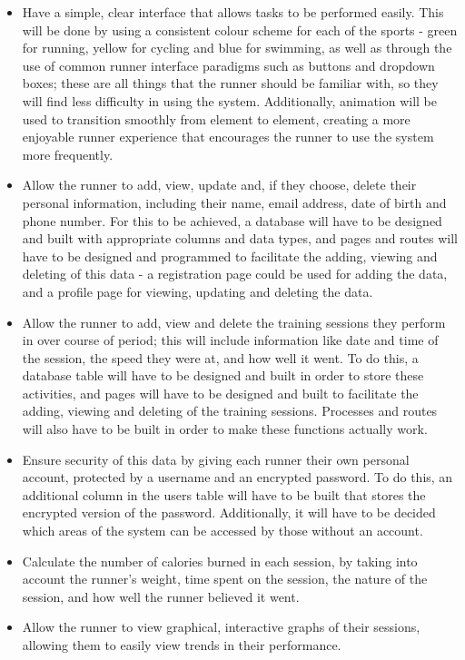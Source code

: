\documentclass{article}[12pt,a4paper]
\begin{document}
\begin{itemize}
    \item Have a simple, clear interface that allows tasks to be performed easily. This will be done by using a consistent colour scheme for each of the sports - green for running, yellow for cycling and blue for swimming, as well as through the use of common runner interface paradigms such as buttons and dropdown boxes; these are all things that the runner should be familiar with, so they will find less difficulty in using the system. Additionally, animation will be used to transition smoothly from element to element, creating a more enjoyable runner experience that encourages the runner to use the system more frequently.

    \item Allow the runner to add, view, update and, if they choose, delete their personal information, including their name, email address, date of birth and phone number. For this to be achieved, a database will have to be designed and built with appropriate columns and data types, and pages and routes will have to be designed and programmed to facilitate the adding, viewing and deleting of this data - a registration page could be used for adding the data, and a profile page for viewing, updating and deleting the data.

    \item Allow the runner to add, view and delete the training sessions they perform in over course of period; this will include information like date and time of the session, the speed they were at, and how well it went. To do this, a database table will have to be designed and built in order to store these activities, and pages will have to be designed and built to facilitate the adding, viewing and deleting of the training sessions. Processes and routes will also have to be built in order to make these functions actually work.

    \item Ensure security of this data by giving each runner their own personal account, protected by a username and an encrypted password. To do this, an additional column in the users table will have to be built that stores the encrypted version of the password. Additionally, it will have to be decided which areas of the system can be accessed by those without an account.

    \item Calculate the number of calories burned in each session, by taking into account the runner's weight, time spent on the session,  the nature of the session, and how well the runner believed it went.

    \item Allow the runner to view graphical, interactive graphs of their sessions, allowing them to easily view trends in their performance.
\end{itemize}
\end{document}
